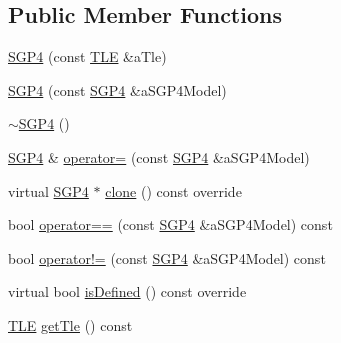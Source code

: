\subsection*{Public Member Functions}
\begin{DoxyCompactItemize}
\item 
\hyperlink{classlibrary_1_1astro_1_1trajectory_1_1orbit_1_1models_1_1_s_g_p4_aeb4f0869431bf4c65d8edaff53ae6ece}{S\+G\+P4} (const \hyperlink{classlibrary_1_1astro_1_1trajectory_1_1orbit_1_1models_1_1sgp4_1_1_t_l_e}{T\+LE} \&a\+Tle)
\item 
\hyperlink{classlibrary_1_1astro_1_1trajectory_1_1orbit_1_1models_1_1_s_g_p4_a8369d666690d2d83840eb9cd6456865e}{S\+G\+P4} (const \hyperlink{classlibrary_1_1astro_1_1trajectory_1_1orbit_1_1models_1_1_s_g_p4}{S\+G\+P4} \&a\+S\+G\+P4\+Model)
\item 
\hyperlink{classlibrary_1_1astro_1_1trajectory_1_1orbit_1_1models_1_1_s_g_p4_a317b4bca86822147ef5b71f8dea4f910}{$\sim$\+S\+G\+P4} ()
\item 
\hyperlink{classlibrary_1_1astro_1_1trajectory_1_1orbit_1_1models_1_1_s_g_p4}{S\+G\+P4} \& \hyperlink{classlibrary_1_1astro_1_1trajectory_1_1orbit_1_1models_1_1_s_g_p4_a44ff4ee45fa5becbb65cb9750ab2075f}{operator=} (const \hyperlink{classlibrary_1_1astro_1_1trajectory_1_1orbit_1_1models_1_1_s_g_p4}{S\+G\+P4} \&a\+S\+G\+P4\+Model)
\item 
virtual \hyperlink{classlibrary_1_1astro_1_1trajectory_1_1orbit_1_1models_1_1_s_g_p4}{S\+G\+P4} $\ast$ \hyperlink{classlibrary_1_1astro_1_1trajectory_1_1orbit_1_1models_1_1_s_g_p4_afa3add6c6855ac1da5632b17986dca02}{clone} () const override
\item 
bool \hyperlink{classlibrary_1_1astro_1_1trajectory_1_1orbit_1_1models_1_1_s_g_p4_af41acfeaec0d9896f15683ed20baf479}{operator==} (const \hyperlink{classlibrary_1_1astro_1_1trajectory_1_1orbit_1_1models_1_1_s_g_p4}{S\+G\+P4} \&a\+S\+G\+P4\+Model) const
\item 
bool \hyperlink{classlibrary_1_1astro_1_1trajectory_1_1orbit_1_1models_1_1_s_g_p4_a7efaabc3ed948705fdecf07a13fb104c}{operator!=} (const \hyperlink{classlibrary_1_1astro_1_1trajectory_1_1orbit_1_1models_1_1_s_g_p4}{S\+G\+P4} \&a\+S\+G\+P4\+Model) const
\item 
virtual bool \hyperlink{classlibrary_1_1astro_1_1trajectory_1_1orbit_1_1models_1_1_s_g_p4_a2d70ef4601e453156a430115e11ce8d7}{is\+Defined} () const override
\item 
\hyperlink{classlibrary_1_1astro_1_1trajectory_1_1orbit_1_1models_1_1sgp4_1_1_t_l_e}{T\+LE} \hyperlink{classlibrary_1_1astro_1_1trajectory_1_1orbit_1_1models_1_1_s_g_p4_a45a7bfb2099d304436898113706e1000}{get\+Tle} () const

\end{DoxyCompactItemize}
